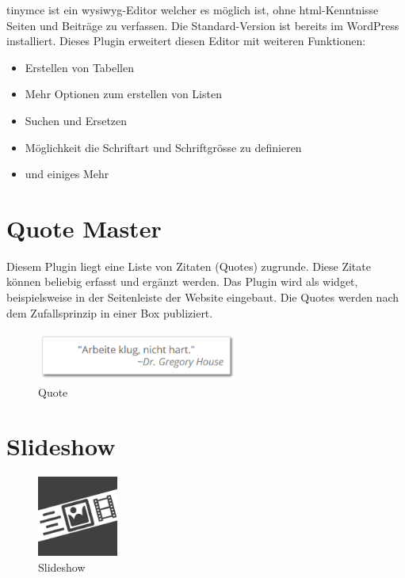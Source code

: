 \documentclass[a4paper,11pt,twoside,titlepage,openright]{report}
\numberwithin{equation}{section}		%
\numberwithin{figure}{section}			%
\numberwithin{table}{section}				%
\begin{document}
\acrshort{tinymce} ist ein \acrshort{wysiwyg}-Editor welcher es möglich ist, ohne \acrshort{html}-Kenntnisse Seiten und Beiträge zu verfassen. Die Standard-Version ist bereits im WordPress installiert. Dieses Plugin erweitert diesen Editor mit weiteren Funktionen:

\begin{itemize}
\item Erstellen von Tabellen
\item Mehr Optionen zum erstellen von Listen
\item Suchen und Ersetzen
\item Möglichkeit die Schriftart und Schriftgrösse zu definieren
\item und einiges Mehr
\end{itemize}


\section{Quote Master}

Diesem Plugin liegt eine Liste von Zitaten (Quotes) zugrunde. Diese Zitate können beliebig erfasst und ergänzt werden. Das Plugin wird als \gls{widget}, beispielsweise in der Seitenleiste der Website eingebaut. Die Quotes werden nach dem Zufallsprinzip in einer Box publiziert.

\begin{figure}[H]
\centering
\includegraphics[width=250px]{Images/quote.png}
\caption{Quote}
\end{figure}

\section{Slideshow}

\begin{figure}
\vspace{-20pt}
\centering
\includegraphics[width=100px]{Images/slideshow.png}
\caption{Slideshow}
\vspace{-20pt}
\end{figure}
\end{document}
